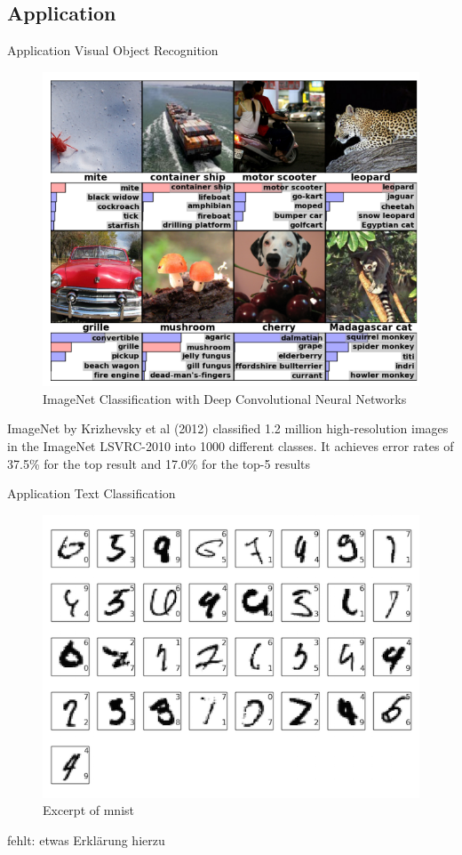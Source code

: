 \documentclass[12pt]{beamer}
\begin{document}
\subsection{Application}
\begin{frame}{Application}
Visual Object Recognition
\begin{figure}
\centering
\includegraphics[width = 0.4\linewidth]{images/KSH-results.png}
\caption{ImageNet Classification with Deep Convolutional
Neural Networks}
\label{fig:principle}
\end{figure}
ImageNet by Krizhevsky et al (2012) classified 1.2 million
high-resolution images in the ImageNet LSVRC-2010 into 1000 different classes.
It achieves error rates of 37.5\% for the top result and 17.0\% for the top-5 results



\end{frame}

\begin{frame}{Application}
Text Classification
\begin{figure}
\centering
\includegraphics[width = 0.4\linewidth]{images/mnist.png}
\caption{Excerpt of mnist}
\label{fig:principle}
\end{figure}
fehlt: etwas Erklärung hierzu
\end{frame}
\end{document}
